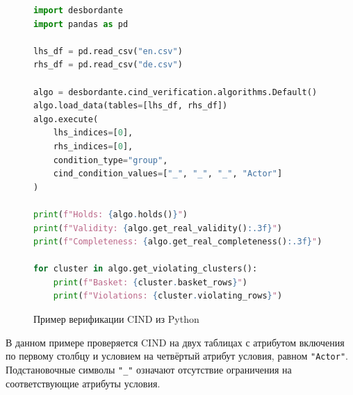 \begin{figure}[h]
\centering
\begin{lstlisting}[language=Python, frame=single, basicstyle=\small\ttfamily, breaklines=true]
import desbordante
import pandas as pd

lhs_df = pd.read_csv("en.csv")
rhs_df = pd.read_csv("de.csv")

algo = desbordante.cind_verification.algorithms.Default()
algo.load_data(tables=[lhs_df, rhs_df])
algo.execute(
    lhs_indices=[0],
    rhs_indices=[0],
    condition_type="group",
    cind_condition_values=["_", "_", "_", "Actor"]
)

print(f"Holds: {algo.holds()}")
print(f"Validity: {algo.get_real_validity():.3f}")
print(f"Completeness: {algo.get_real_completeness():.3f}")

for cluster in algo.get_violating_clusters():
    print(f"Basket: {cluster.basket_rows}")
    print(f"Violations: {cluster.violating_rows}")
\end{lstlisting}
\caption{Пример верификации CIND из Python}
\label{lst:verify_example}
\end{figure}

В данном примере проверяется CIND на двух таблицах с атрибутом включения по первому столбцу и условием на четвёртый атрибут условия, равном \texttt{"Actor"}. Подстановочные символы \texttt{"\_"} означают отсутствие ограничения на соответствующие атрибуты условия.


